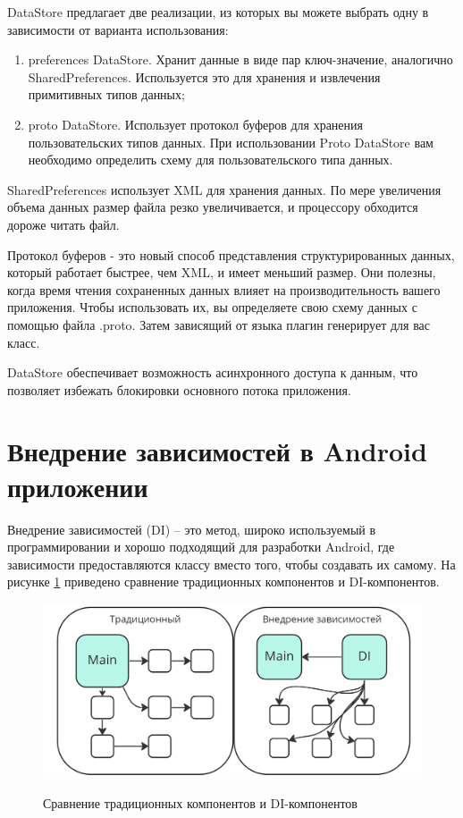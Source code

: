 DataStore предлагает две реализации, из которых вы можете выбрать одну в зависимости от варианта использования:

\begin{enumerate}
    \item preferences DataStore. Хранит данные в виде пар ключ-значение, аналогично SharedPreferences. Используется это для хранения и извлечения примитивных типов данных;
    \item proto DataStore. Использует протокол буферов для хранения пользовательских типов данных. При использовании Proto DataStore вам необходимо определить схему для пользовательского типа данных.
\end{enumerate}

SharedPreferences использует XML для хранения данных. По мере увеличения объема данных размер файла резко увеличивается, и процессору обходится дороже читать файл.

Протокол буферов - это новый способ представления структурированных данных, который работает быстрее, чем XML, и имеет меньший размер. Они полезны, когда время чтения сохраненных данных влияет на производительность вашего приложения. Чтобы использовать их, вы определяете свою схему данных с помощью файла .proto. Затем зависящий от языка плагин генерирует для вас класс.

DataStore обеспечивает возможность асинхронного доступа к данным, что позволяет избежать блокировки основного потока приложения.

\section{Внедрение зависимостей в Android приложении}

Внедрение зависимостей (DI) -- это метод, широко используемый в программировании и хорошо подходящий для разработки Android, где зависимости предоставляются классу вместо того, чтобы создавать их самому. На рисунке \ref{fig:DI} приведено сравнение традиционных компонентов и DI-компонентов.

\begin{figure}[h!]
    \begin{center}
        \includegraphics[width=0.95\hsize]{fig/di.png}\\[2mm]
        \caption{Сравнение традиционных компонентов и DI-компонентов}\label{fig:DI}
    \end{center}
\end{figure}

